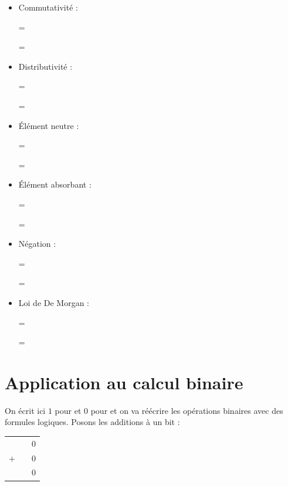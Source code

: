{\begin{multicols}{2}
\begin{itemize}
	 =  
	
	 = 
    \item Commutativité : 
    
     = 
    
     = 
    \item Distributivité :
    
     
     \qquad =  
     
     
     \qquad = 
     
     \columnbreak
    \item Élément neutre : 
    
     = 
    
     = 
    \item Élément absorbant : 
    
     = 
    
     = 
    \item Négation : 
    
     = 
    
     = 
    \item Loi de De Morgan : 
    
     = 
    
     = 
\end{itemize}\end{multicols}

\section{Application au calcul binaire}

On écrit ici $1$ pour  et $0$ pour  et on va réécrire les opérations binaires avec des formules logiques. Posons les additions à un bit :

\begin{center}
\begin{multicols}{5}
\begin{tabular}{c@{\,}c@{\,}c}
    &   & $0$ \\
$+$ &   & $0$ \\
\hline
    &   & $0$\\
\end{tabular}



\end{multicols}
\end{center}}
